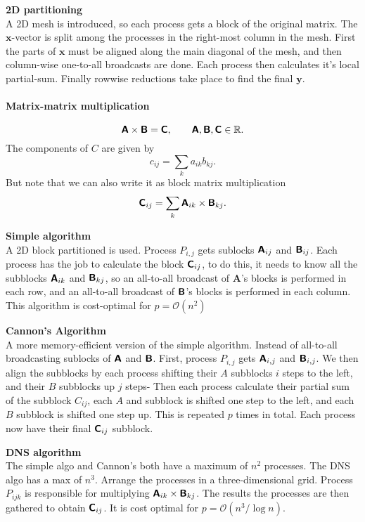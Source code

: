 \documentclass[a4paper,10pt,twoside,twocolumn]{article}
\renewcommand{\(}{\left(}
\renewcommand{\)}{\right)}
\newcommand{\bt}[1]{\boldsymbol{#1}}
\newcommand{\mat}[1]{\textsf{\textbf{#1}}}
\begin{document}
\textbf{2D partitioning} \\
A 2D mesh is introduced, so each process gets a block of the original matrix. The $\bt{x}$-vector is split among the processes in the right-most column in the mesh. First the parts of $\bt{x}$ must be aligned along the main diagonal of the mesh, and then column-wise one-to-all broadcasts are done. Each process then calculates it's local partial-sum. Finally rowwise reductions take place to find the final $\bt{y}$.


\paragraph{Matrix-matrix multiplication}
$$\mat{A}\times\mat{B} = \mat{C}, \qquad \mat{A}, \mat{B}, \mat{C} \in \mathbb{R}.$$
The components of $C$ are given by
$$c_{ij} = \sum_k a_{ik}b_{kj}.$$
But note that we can also write it as block matrix multiplication
$$\mat{C}_{ij} = \sum_k \mat{A}_{ik}\times \mat{B}_{kj}.$$

\textbf{Simple algorithm} \\
A 2D block partitioned is used. Process $P_{i,j}$ gets sublocks $\mat{A}_{ij}$ and $\mat{B}_{ij}$. Each process has the job to calculate the block $\mat{C}_{ij}$, to do this, it needs to know all the subblocks $\mat{A}_{ik}$ and $\mat{B}_{kj}$, so an all-to-all broadcast of \mat{A}'s blocks is performed in each row, and an all-to-all broadcast of $\mat{B}$'s blocks is performed in each column.
This algorithm is cost-optimal for $p=\mathcal{O}(n^2)$


\textbf{Cannon's Algorithm} \\
A more memory-efficient version of the simple algorithm. Instead of all-to-all broadcasting sublocks of $\mat{A}$ and $\mat{B}$. First, process $P_{i,j}$ gets $\mat{A}_{i,j}$ and $\mat{B}_{i,j}$. We then align the subblocks by each process shifting their $A$ subblocks $i$ steps to the left, and their $B$ subblocks up $j$ steps- Then each process calculate their partial sum of the subblock $C_{ij}$, each $A$ and subblock is shifted one step to the left, and each $B$ subblock is shifted one step up. This is repeated $p$ times in total. Each process now have their final $\mat{C}_{ij}$ subblock. 

\textbf{DNS algorithm} \\
The simple algo and Cannon's both have a maximum of $n^2$ processes. The DNS algo has a max of $n^3$. Arrange the processes in a three-dimensional grid. Process $P_{ijk}$ is responsible for multiplying $\mat{A}_{ik}\times \mat{B}_{kj}$. The results the processes are then gathered to obtain $\mat{C}_{ij}$.
It is cost optimal for $p = \mathcal{O}(n^3/\log n)$.
\end{document}
